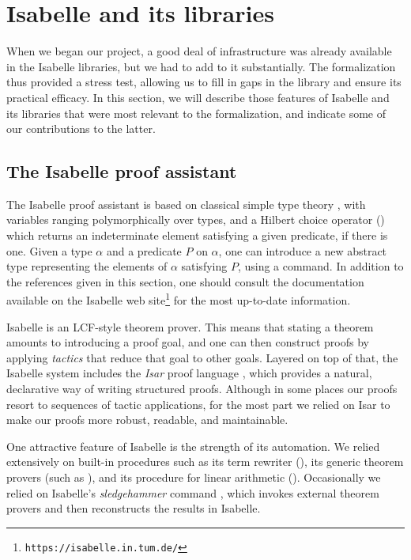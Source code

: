 \documentclass{svjour3}
\begin{document}
\section{Isabelle and its libraries}
\label{section:isabelle}

When we began our project, a good deal of infrastructure was already available in the Isabelle libraries, but we had to add to it substantially. The formalization thus provided a stress test, allowing us to fill in gaps in the library and ensure its practical efficacy. In this section, we will describe those features of Isabelle and its libraries that were most relevant to the formalization, and indicate some of our contributions to the latter.

\subsection{The Isabelle proof assistant}

The Isabelle proof assistant \cite{nipkow:et:al:02} is based on classical simple type theory \cite{church:40}, with variables ranging polymorphically over types, and a Hilbert choice operator () which returns an indeterminate element satisfying a given predicate, if there is one. Given a type $\alpha$ and a predicate $P$ on $\alpha$, one can introduce a new abstract type representing the elements of $\alpha$ satisfying $P$, using a  command. In addition to the references given in this section, one should consult the documentation available on the Isabelle web site\footnote{\texttt{https://isabelle.in.tum.de/}} for the most up-to-date information.

Isabelle is an LCF-style theorem prover. This means that stating a theorem amounts to introducing a proof goal, and one can then construct proofs by applying \emph{tactics} that reduce that goal to other goals. Layered on top of that, the Isabelle system includes the \emph{Isar} proof language \cite{wenzel:02}, which provides a natural, declarative way of writing structured proofs. Although in some places our proofs resort to sequences of tactic applications, for the most part we relied on Isar to make our proofs more robust, readable, and maintainable. 

One attractive feature of Isabelle is the strength of its automation. We relied extensively on built-in procedures such as its term rewriter (), its generic theorem provers (such as ), and its procedure for linear arithmetic (). Occasionally we relied on Isabelle's \emph{sledgehammer} command \cite{paulson:10}, which invokes external theorem provers and then reconstructs the results in Isabelle.
\end{document}
